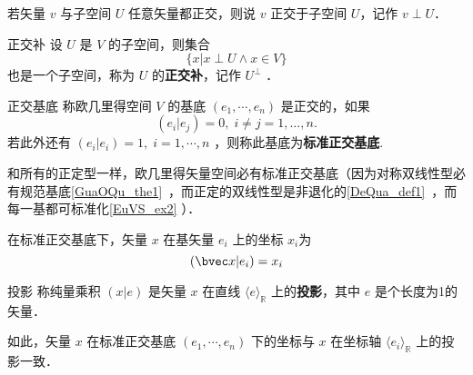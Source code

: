 若矢量 $v$ 与子空间 $U$ 任意矢量都正交，则说 $v$ 正交于子空间 $U$，记作 $v\perp U$．
\begin{definition}{正交补}
设 $U$ 是 $V$ 的子空间，则集合
\begin{equation}
\{ x| x\perp U\wedge x\in V\}
\end{equation}
也是一个子空间，称为 $U$ 的\textbf{正交补}，记作 $U^{\perp}$ ．
\end{definition}
\begin{definition}{正交基底}
称欧几里得空间 $V$ 的基底 $(e_1,\cdots,e_n)$ 是正交的，如果
\begin{equation}
( e_i| e_j)=0,\;i\neq j=1,\dots,n.
\end{equation}
若此外还有 $( e_i| e_i)=1,\;i=1,\cdots ,n$ ，则称此基底为\textbf{标准正交基底}.
\end{definition}

和所有的正定型一样，欧几里得矢量空间必有标准正交基底（因为对称双线性型必有规范基底\autoref{GuaOQu_the1}~，而正定的双线性型是非退化的\autoref{DeQua_def1}~，而每一基都可标准化\autoref{EuVS_ex2} ）．
\begin{exercise}{}
在标准正交基底下，矢量 $x$ 在基矢量 $e_i$ 上的坐标 $x_i$为
\begin{equation}
(\bvec x| e_i)=x_i
\end{equation}
\end{exercise}
\begin{definition}{投影}
称纯量乘积 $( x| e)$ 是矢量 $x$ 在直线 $\langle e\rangle_{\mathbb R}$ 上的\textbf{投影}，其中 $ e$ 是个长度为1的矢量．  
\end{definition}
如此，矢量 $ x$ 在标准正交基底 $( e_1,\cdots, e_n)$ 下的坐标与 $x$ 在坐标轴 $\langle e_i\rangle_\mathbb{R}$ 上的投影一致． 